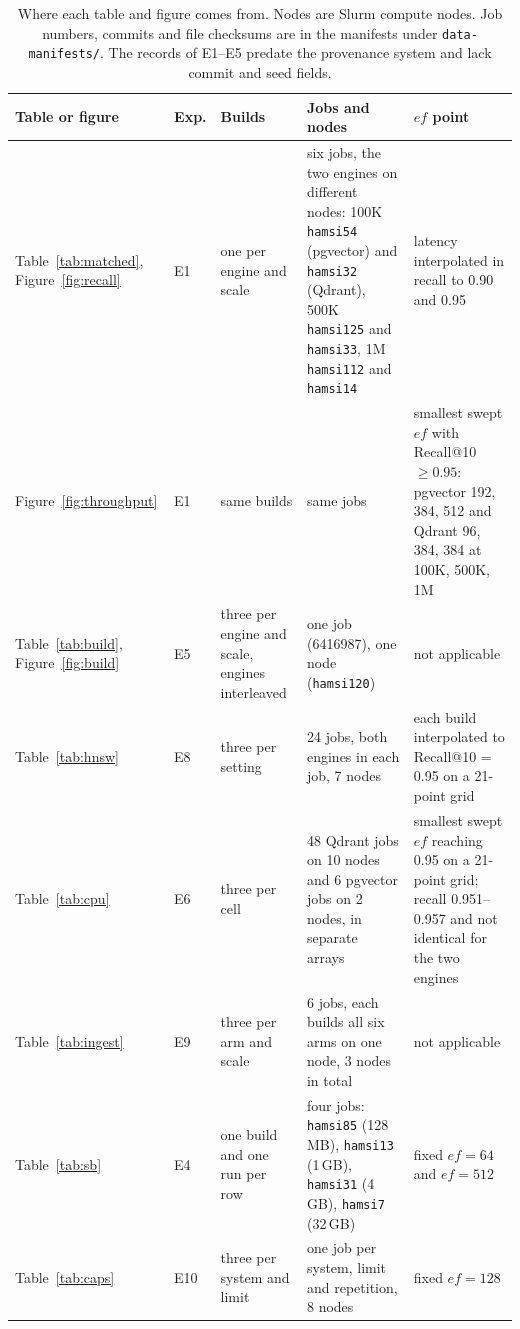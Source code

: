 \documentclass[preprint,12pt]{elsarticle}
\begin{document}
\begin{table}[t]
  \caption{Where each table and figure comes from. Nodes are Slurm compute nodes. Job numbers,
  commits and file checksums are in the manifests under \texttt{data-manifests/}. The records of
  E1--E5 predate the provenance system and lack commit and seed fields.}
  \label{tab:sources}
  \small
  \begin{tabular}{p{}p{}p{}p{}p{}}
    \toprule
    Table or figure & Exp. & Builds & Jobs and nodes & $ef$ point \\
    \midrule
    Table~\ref{tab:matched}, Figure~\ref{fig:recall} & E1 & one per engine and scale &
      six jobs, the two engines on different nodes: 100K \texttt{hamsi54} (pgvector) and
      \texttt{hamsi32} (Qdrant), 500K \texttt{hamsi125} and \texttt{hamsi33}, 1M
      \texttt{hamsi112} and \texttt{hamsi14} &
      latency interpolated in recall to 0.90 and 0.95 \\
    Figure~\ref{fig:throughput} & E1 & same builds &
      same jobs &
      smallest swept $ef$ with Recall@10 $\ge 0.95$: pgvector 192, 384, 512 and Qdrant 96,
      384, 384 at 100K, 500K, 1M \\
    Table~\ref{tab:build}, Figure~\ref{fig:build} & E5 & three per engine and scale, engines
      interleaved & one job (6416987), one node (\texttt{hamsi120}) & not applicable \\
    Table~\ref{tab:hnsw} & E8 & three per setting & 24 jobs, both engines in each job, 7 nodes &
      each build interpolated to Recall@10 = 0.95 on a 21-point grid \\
    Table~\ref{tab:cpu} & E6 & three per cell & 48 Qdrant jobs on 10 nodes and 6 pgvector jobs on
      2 nodes, in separate arrays & smallest swept $ef$ reaching 0.95 on a 21-point grid;
      recall 0.951--0.957 and not identical for the two engines \\
    Table~\ref{tab:ingest} & E9 & three per arm and scale & 6 jobs, each builds all six arms on
      one node, 3 nodes in total & not applicable \\
    Table~\ref{tab:sb} & E4 & one build and one run per row & four jobs: \texttt{hamsi85}
      (128\,MB), \texttt{hamsi13} (1\,GB), \texttt{hamsi31} (4\,GB), \texttt{hamsi7} (32\,GB) &
      fixed $ef=64$ and $ef=512$ \\
    Table~\ref{tab:caps} & E10 & three per system and limit & one job per system, limit and
      repetition, 8 nodes & fixed $ef=128$ \\

\end{tabular}
\end{table}
\end{document}
